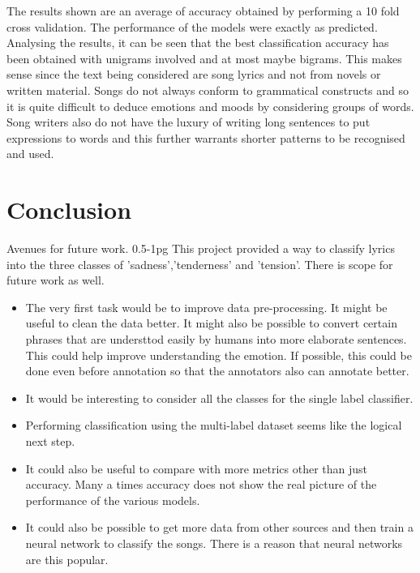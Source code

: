 \documentclass[11pt,a4paper]{article}
\begin{document}
The results shown are an average of accuracy obtained by performing a 10 fold cross validation. The performance of the models were exactly as predicted.\\
Analysing the results, it can be seen that the best classification accuracy has been obtained with unigrams involved and at most maybe bigrams. This makes sense since the text being considered are song lyrics and not from novels or written material. Songs do not always conform to grammatical constructs and so it is quite difficult to deduce emotions and moods by considering groups of words. Song writers also do not have the luxury of writing long sentences to put expressions to words and this further warrants shorter patterns to be recognised and used.

\section{Conclusion}
\label{conclusion}
Avenues for future work. 0.5-1pg
This project provided a way to classify lyrics into the three classes of 'sadness','tenderness' and 'tension'. There is scope for future work as well.
\begin{itemize}
  \item The very first task would be to improve data pre-processing. It might be useful to clean the data better. It might also be possible to convert certain phrases that are understtod easily by humans into more elaborate sentences. This could help improve understanding the emotion. If possible, this could be done even before annotation so that the annotators also can annotate better.
  \item It would be interesting to consider all the classes for the single label classifier. 
  \item Performing classification using the multi-label dataset seems like the logical next step. 
  \item It could also be useful to compare with more metrics other than just accuracy. Many a times accuracy does not show the real picture of the performance of the various models. 
  \item It could also be possible to get more data from other sources and then train a neural network to classify the songs. There is a reason that neural networks are this popular.
\end{itemize}




\appendix
\end{document}
